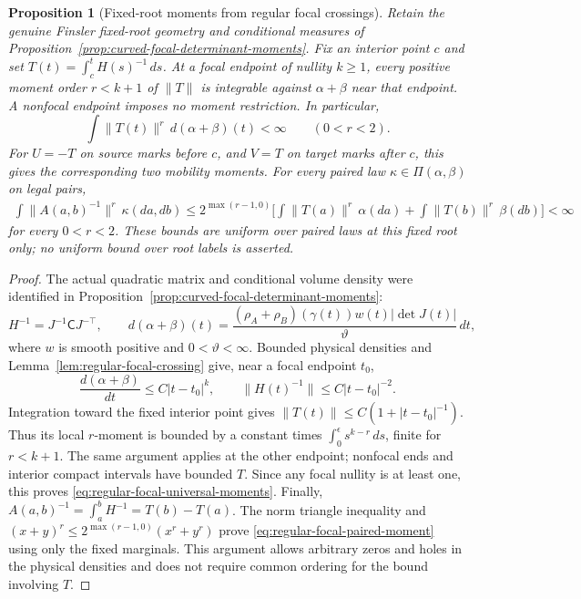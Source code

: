 \documentclass[11pt,reqno]{amsart}
\newtheorem{proposition}[theorem]{Proposition}
\theoremstyle{definition}
\theoremstyle{remark}
\numberwithin{equation}{section}
\begin{document}
\begin{proposition}[Fixed-root moments from regular focal crossings]
\label{prop:regular-focal-crossing-moments}
Retain the genuine Finsler fixed-root geometry and conditional measures
of Proposition~\ref{prop:curved-focal-determinant-moments}. Fix an
interior point \(c\) and set \(T(t)=\int_c^t H(s)^{-1}\,ds\).
At a focal endpoint of nullity \(k\ge1\), every positive moment order
\(r<k+1\) of \(\|T\|\) is integrable against \(\alpha+\beta\) near
that endpoint. A nonfocal endpoint imposes no moment restriction.
In particular,
\begin{equation}
\label{eq:regular-focal-universal-moments}
 \int\|T(t)\|^r\,d(\alpha+\beta)(t)<\infty
 \qquad(0<r<2).
\end{equation}
For \(U=-T\) on source marks before \(c\), and \(V=T\) on target
marks after \(c\), this gives the corresponding two mobility moments.
For every paired law \(\kappa\in\Pi(\alpha,\beta)\) on legal pairs,
\begin{equation}
\label{eq:regular-focal-paired-moment}
 \begin{split}
 \int\|A(a,b)^{-1}\|^r\,\kappa(da,db)
 \le 2^{\max(r-1,0)}\biggl[
 \int\|T(a)\|^r\,\alpha(da)
 +\int\|T(b)\|^r\,\beta(db)\biggr]<\infty
 \end{split}
\end{equation}
for every \(0<r<2\). These bounds are uniform over paired laws at
this fixed root only; no uniform bound over root labels is asserted.
\end{proposition}
\begin{proof}
The actual quadratic matrix and conditional volume density were
identified in Proposition~\ref{prop:curved-focal-determinant-moments}:
\[
 H^{-1}=J^{-1}\mathsf C J^{-\top},\qquad
 d(\alpha+\beta)(t)
 =\frac{(\rho_A+\rho_B)(\gamma(t))w(t)|\det J(t)|}{\vartheta}\,dt,
\]
where \(w\) is smooth positive and \(0<\vartheta<\infty\).
Bounded physical densities and Lemma~\ref{lem:regular-focal-crossing}
give, near a focal endpoint \(t_0\),
\[
 \frac{d(\alpha+\beta)}{dt}\le C|t-t_0|^k,\qquad
 \|H(t)^{-1}\|\le C|t-t_0|^{-2}.
\]
Integration toward the fixed interior point gives
\(\|T(t)\|\le C(1+|t-t_0|^{-1})\). Thus its local \(r\)-moment is
bounded by a constant times \(\int_0^\epsilon s^{k-r}\,ds\), finite
for \(r<k+1\). The same argument applies at the other endpoint;
nonfocal ends and interior compact intervals have bounded \(T\).
Since any focal nullity is at least one, this proves
\eqref{eq:regular-focal-universal-moments}.
Finally,
\(A(a,b)^{-1}=\int_a^b H^{-1}=T(b)-T(a)\).
The norm triangle inequality and
\((x+y)^r\le2^{\max(r-1,0)}(x^r+y^r)\) prove
\eqref{eq:regular-focal-paired-moment} using only the fixed marginals.
This argument allows arbitrary zeros and holes in the physical densities
and does not require common ordering for the bound involving \(T\).
\end{proof}
\end{document}
